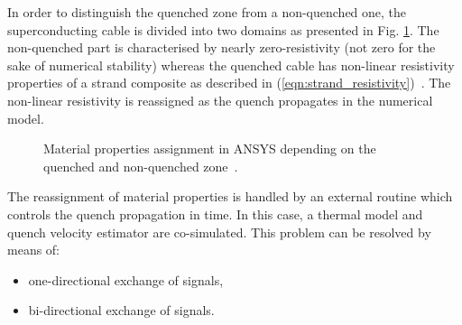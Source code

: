 
In order to distinguish the quenched zone from a non-quenched one, the superconducting cable is divided into two domains as presented in Fig. \ref{fig:ansys_material_assignment}. The non-quenched part is characterised by nearly zero-resistivity (not zero for the sake of numerical stability) whereas the quenched cable has non-linear resistivity properties of a strand composite as described in (\ref{eqn:strand_resistivity})~\cite{simon_mcintosh_private_communication}. The non-linear resistivity is reassigned as the quench propagates in the numerical model.

\begin{figure}[H]
\centering
{}
\caption{Material properties assignment in ANSYS depending on the quenched and non-quenched zone~\cite{simon_mcintosh_private_communication}.}
    \label{fig:ansys_material_assignment}
\end{figure}

The reassignment of material properties is handled by an external routine which controls the quench propagation in time. In this case, a thermal model and quench velocity estimator are co-simulated. This problem can be resolved by means of: 

\begin{itemize}
    \item one-directional exchange of signals,
    \item bi-directional exchange of signals.
\end{itemize}

